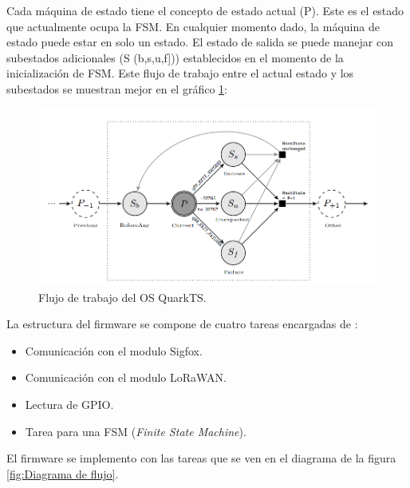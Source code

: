 Cada máquina de estado tiene el concepto de estado actual (P). Este es el estado que actualmente ocupa la FSM. En cualquier momento dado, la máquina de estado puede estar en solo un estado. El estado de salida se puede manejar con subestados adicionales (S (b,s,u,f])) establecidos en el momento de la inicialización de FSM. Este flujo de trabajo entre el actual
estado y los subestados se muestran mejor en el gráfico \ref{fig:FSMQartkts}: 

\begin{figure}[H]
	\centering
	\includegraphics[scale=.65]{./Figures/FSMQartkts.PNG}
	\caption{Flujo de trabajo del OS QuarkTS.\protect\footnotemark}
	\label{fig:FSMQartkts}
\end{figure}
La estructura del firmware se compone de cuatro tareas encargadas de :
\begin{itemize}
    \item Comunicación con el modulo Sigfox.
    \item Comunicación con el modulo LoRaWAN.
    \item Lectura de GPIO.
    \item Tarea para una FSM (\textit{Finite State Machine}).
\end{itemize}

El firmware se implemento con las tareas que se ven en el diagrama de la figura \ref{fig:Diagrama de flujo}.


